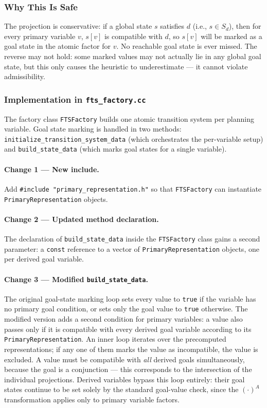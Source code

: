 \documentclass[11pt,a4paper]{article}
\begin{document}
\subsubsection{Why This Is Safe}

The projection is conservative: if a global state $s$ satisfies $d$ (i.e.,
$s \in S_d$), then for every primary variable $v$, $s[v]$ is compatible with
$d$, so $s[v]$ will be marked as a goal state in the atomic factor for $v$.
No reachable goal state is ever missed.  The reverse may not hold: some marked
values may not actually lie in any global goal state, but this only causes the
heuristic to underestimate — it cannot violate admissibility.

\subsubsection{Implementation in \texttt{fts\_factory.cc}}

The factory class \texttt{FTSFactory} builds one atomic transition system per
planning variable.  Goal state marking is handled in two methods:
\texttt{initialize\_transition\_system\_data} (which orchestrates the
per-variable setup) and \texttt{build\_state\_data} (which marks goal states
for a single variable).

\paragraph{Change 1 — New include.}
Add \texttt{\#include "primary\_representation.h"} so that
\texttt{FTSFactory} can instantiate \texttt{PrimaryRepresentation} objects.

\paragraph{Change 2 — Updated method declaration.}
The declaration of \texttt{build\_state\_data} inside the \texttt{FTSFactory}
class gains a second parameter: a \texttt{const} reference to a vector of
\texttt{PrimaryRepresentation} objects, one per derived goal variable.

\paragraph{Change 3 — Modified \texttt{build\_state\_data}.}
The original goal-state marking loop sets every value to \texttt{true} if the
variable has no primary goal condition, or sets only the goal value to
\texttt{true} otherwise.  The modified version adds a second condition for
primary variables: a value also passes only if it is compatible with every
derived goal variable according to its \texttt{PrimaryRepresentation}.  An
inner loop iterates over the precomputed representations; if any one of them
marks the value as incompatible, the value is excluded.  A value must be
compatible with \emph{all} derived goals simultaneously, because the goal is
a conjunction — this corresponds to the intersection of the individual
projections.  Derived variables bypass this loop entirely: their goal states
continue to be set solely by the standard goal-value check, since the
$(\cdot)^A$ transformation applies only to primary variable factors.
\end{document}

